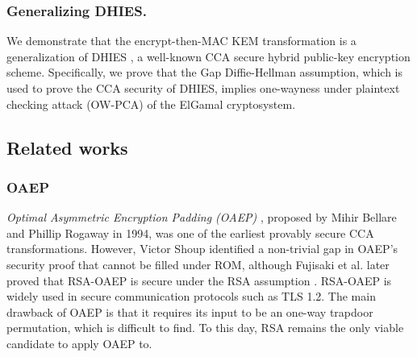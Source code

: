\documentclass[runningheads]{llncs}
\begin{document}
\subsubsection{Generalizing DHIES.} We demonstrate that the encrypt-then-MAC KEM transformation is a generalization of DHIES \cite{DBLP:conf/ctrsa/AbdallaBR01,DBLP:journals/iacr/AbdallaBR99}, a well-known CCA secure hybrid public-key encryption scheme. Specifically, we prove that the Gap Diffie-Hellman assumption, which is used to prove the CCA security of DHIES, implies one-wayness under plaintext checking attack (OW-PCA) of the ElGamal cryptosystem.



\subsection{Related works}\label{sec:related-works}
\subsubsection{OAEP}
\textit{Optimal Asymmetric Encryption Padding (OAEP)} \cite{DBLP:conf/eurocrypt/BellareR94}, proposed by Mihir Bellare and Phillip Rogaway in 1994, was one of the earliest provably secure CCA transformations. However, Victor Shoup identified a non-trivial gap in OAEP's security proof that cannot be filled under ROM\cite{DBLP:conf/crypto/Shoup01}, although Fujisaki et al. later proved that RSA-OAEP is secure under the RSA assumption \cite{DBLP:conf/crypto/FujisakiOPS01}. RSA-OAEP is widely used in secure communication protocols such as TLS 1.2. The main drawback of OAEP is that it requires its input to be an one-way trapdoor permutation, which is difficult to find. To this day, RSA remains the only viable candidate to apply OAEP to.
\end{document}
